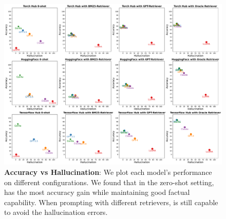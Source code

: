\begin{figure}[t]
    \includegraphics[width=\linewidth]{appendix_figures/grid-3.pdf}
\caption{\footnotesize \textbf{ Accuracy vs Hallucination}: We plot each model's performance on different configurations. We found that in the zero-shot setting, \gorilla{} has the most accuracy gain while maintaining good factual capability. When prompting with different retrievers, \gorilla{} is still capable to avoid the hallucination errors.}
\label{fig:full2}
\end{figure}
